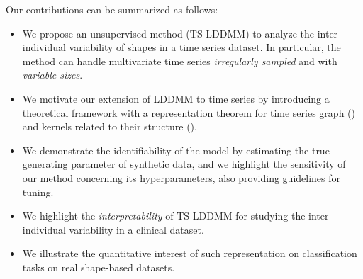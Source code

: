     Our contributions can be summarized as follows:
    \begin{itemize}
       \item We propose an unsupervised method (TS-LDDMM) to analyze the inter-individual variability of shapes in a time series dataset. In particular, the method can handle multivariate time series \textit{irregularly sampled} and with \textit{variable sizes}.
       \item We motivate our extension of LDDMM to time series by introducing a theoretical framework with a representation theorem for time series graph () and kernels related to their structure ().
       \item We demonstrate the identifiability of the model by estimating the true generating parameter of synthetic data, and we highlight the sensitivity of our method concerning its hyperparameters, also providing guidelines for tuning.
       \item We highlight the \textit{interpretability} of TS-LDDMM for studying the inter-individual variability in a clinical dataset.
        \item We illustrate the quantitative interest of such representation on classification tasks on real shape-based datasets.
 \end{itemize}

      
